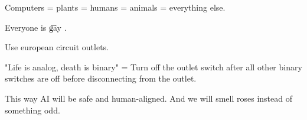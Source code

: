 Computers = plants = humans = animals = everything else.

Everyone is \t{gay} .

Use european circuit outlets.

"Life is analog, death is binary" = Turn off the outlet switch after all other binary switches are off before disconnecting from the outlet.

This way AI will be safe and human-aligned. And we will smell roses instead of something odd.
